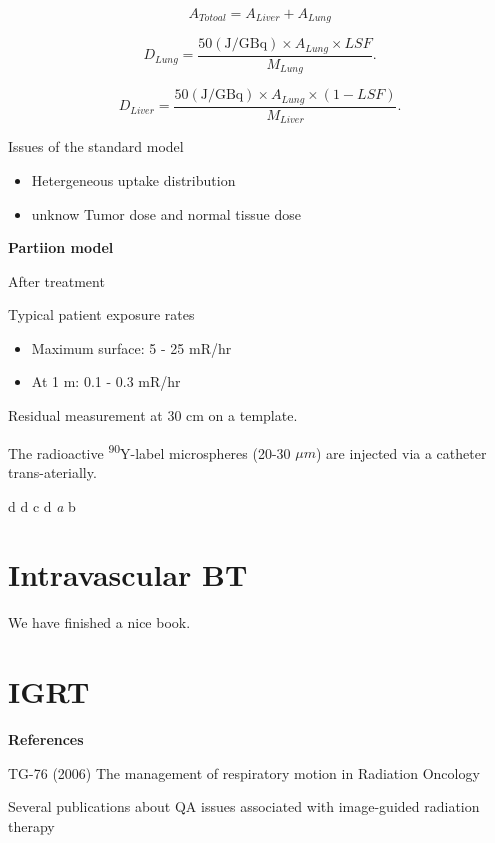 \documentclass[]{book}
\providecommand{\tightlist}{%
  \setlength{\itemsep}{0pt}\setlength{\parskip}{0pt}}
\theoremstyle{definition}
\theoremstyle{definition}
\theoremstyle{definition}
\theoremstyle{remark}
\begin{document}
\[ A_{Totoal} = A_{Liver} + A_{Lung}\]

\begin{equation}
  D_{Lung} = \frac {50 (\text{J}/\text{GBq})\times A_{Lung}\times LSF} {M_{Lung}}. 
  \label{eq:y90-lung}
\end{equation}

\begin{equation}
  D_{Liver} = \frac {50 (\text{J}/\text{GBq})\times A_{Lung}\times (1-LSF)} {M_{Liver}}. 
  \label{eq:y90-liver}
\end{equation}

Issues of the standard model

\begin{itemize}
\tightlist
\item
  Hetergeneous uptake distribution
\item
  unknow Tumor dose and normal tissue dose
\end{itemize}

\textbf{Partiion model}

After treatment

Typical patient exposure rates

\begin{itemize}
\tightlist
\item
  Maximum surface: 5 - 25 mR/hr
\item
  At 1 m: 0.1 - 0.3 mR/hr
\end{itemize}

Residual measurement at 30 cm on a template.

The radioactive \textsuperscript{90}Y-label microspheres (20-30
\(\mu m\)) are injected via a catheter trans-aterially.

d d c d \emph{a} b

\chapter{Intravascular BT}\label{ivbt}

We have finished a nice book.

\chapter{IGRT}\label{igrt}

\textbf{References}

TG-76 (2006) The management of respiratory motion in Radiation Oncology

Several publications about QA issues associated with image-guided
radiation therapy
\end{document}
